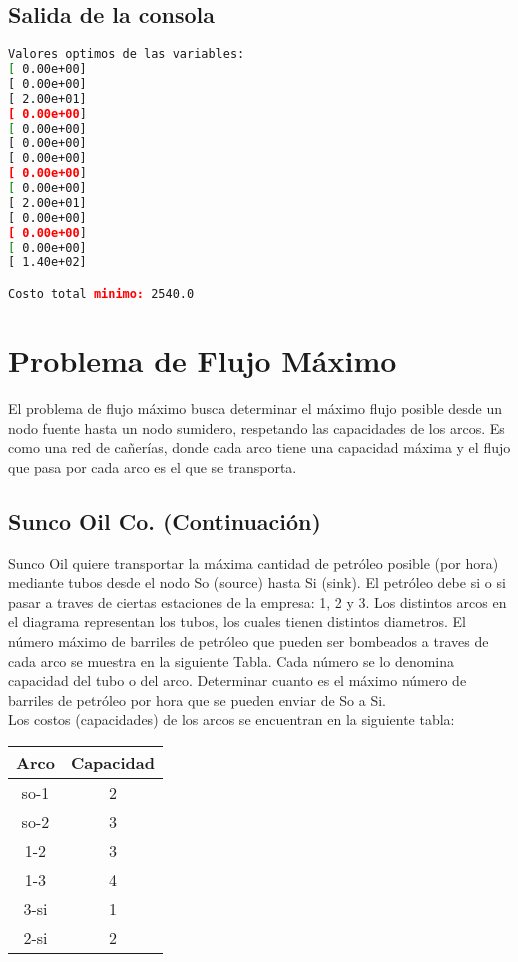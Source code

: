 \documentclass[12pt]{article}
\begin{document}
\subsection{Salida de la consola}

\begin{lstlisting}[language=bash,backgroundcolor=\color{black},basicstyle=\color{white}\ttfamily,numbers=none]
Valores optimos de las variables:
[ 0.00e+00]
[ 0.00e+00]
[ 2.00e+01]
[ 0.00e+00]
[ 0.00e+00]
[ 0.00e+00]
[ 0.00e+00]
[ 0.00e+00]
[ 0.00e+00]
[ 2.00e+01]
[ 0.00e+00]
[ 0.00e+00]
[ 0.00e+00]
[ 1.40e+02]

Costo total minimo: 2540.0
\end{lstlisting}


\section{Problema de Flujo Máximo}

El problema de flujo máximo busca determinar el máximo flujo posible desde un nodo fuente hasta un nodo sumidero, respetando las capacidades de los arcos. Es como una red de cañerías, donde cada arco tiene una capacidad máxima y el flujo que pasa por cada arco es el que se transporta.

\subsection{Sunco Oil Co. (Continuación)}

Sunco Oil quiere transportar la máxima cantidad de petróleo posible (por hora) mediante tubos desde el nodo So (source) hasta Si (sink). El petróleo debe si o si pasar a traves de ciertas estaciones de la empresa: 1, 2 y 3. Los distintos arcos en el diagrama representan los tubos, los cuales tienen distintos diametros. El número máximo de barriles de petróleo que pueden ser bombeados a traves de cada arco se muestra en la siguiente Tabla. Cada número se lo denomina capacidad del tubo o del arco. Determinar cuanto es el máximo número de barriles de petróleo por hora que se pueden enviar de So a Si. \\

Los costos (capacidades) de los arcos se encuentran en la siguiente tabla:

\begin{center}
\begin{tabular}{cc}
\toprule
\textbf{Arco} & \textbf{Capacidad} \\
\midrule
so-1 & 2 \\
so-2 & 3 \\
1-2 & 3 \\
1-3 & 4 \\
3-si & 1 \\
2-si & 2 \\
\bottomrule
\end{tabular}
\end{center}
\end{document}
